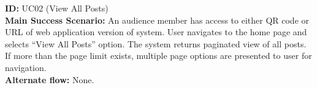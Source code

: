 \textbf{ID:} UC02 (View All Posts) \\
\textbf{Main Success Scenario:} An audience member has access to either QR code or URL of web application version of system. User navigates to the home page and selects ``View All Posts'' option. The system returns paginated view of all posts. If more than the page limit exists, multiple page options are presented to user for navigation. \\
\textbf{Alternate flow:} None. \\